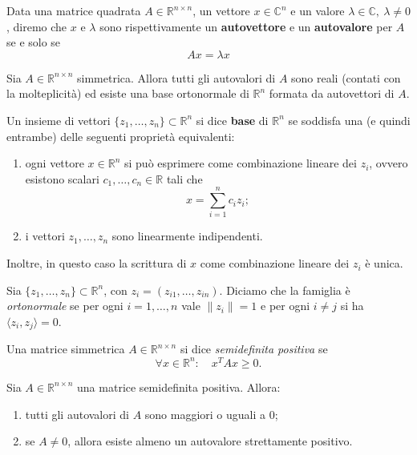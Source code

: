 \begin{definizione}
    Data una matrice quadrata $A \in \mathbb{R}^{n\times n}$, un vettore $x \in \mathbb{C}^n$ e un valore $\lambda \in \mathbb{C},\ \lambda \neq 0$, diremo che $x$ e $\lambda$ sono rispettivamente un \textbf{autovettore} e un \textbf{autovalore} per $A$ se e solo se
    \[
        Ax = \lambda x
    \]
\end{definizione}

\begin{teorema}\label{teo:th_rosso}
    Sia \(A\in\mathbb{R}^{n\times n}\) simmetrica. Allora tutti gli autovalori di \(A\) sono reali (contati con la molteplicità) ed esiste una base ortonormale di \(\mathbb{R}^n\) formata da autovettori di \(A\).
\end{teorema}

\begin{definizione}[Base]
    Un insieme di vettori $\{z_1,\dots,z_n\}\subset\mathbb{R}^n$ si dice \textbf{base} di $\mathbb{R}^n$ se soddisfa una (e quindi entrambe) delle seguenti proprietà equivalenti:
    \begin{enumerate}
        \item ogni vettore $x\in\mathbb{R}^n$ si può esprimere come combinazione lineare dei $z_i$, ovvero esistono scalari $c_1,\dots,c_n\in\mathbb{R}$ tali che
        \[
            x=\sum_{i=1}^n c_i z_i;
        \]
        \item i vettori $z_1,\dots,z_n$ sono linearmente indipendenti.
    \end{enumerate}
    Inoltre, in questo caso la scrittura di $x$ come combinazione lineare dei $z_i$ è unica.
\end{definizione}

\begin{definizione}[Ortonormale]
    Sia $\{z_1,\dots,z_n\} \subset \mathbb{R}^n$, con $z_i=(z_{i1},\dots,z_{in})$.
    Diciamo che la famiglia è \emph{ortonormale} se per ogni \(i=1,\dots,n\) vale \(\|z_i\|=1\) e per ogni \(i\neq j\) si ha \(\langle z_i,z_j\rangle=0\).
\end{definizione}

\begin{definizione}
    Una matrice simmetrica \(A\in\mathbb{R}^{n\times n}\) si dice \emph{semidefinita positiva} se
    \[
        \forall x\in\mathbb{R}^n:\quad x^{T} A x \ge 0.
    \]
\end{definizione}

\begin{teorema}\label{teo:th_blu}
    Sia $A\in\mathbb{R}^{n\times n}$ una matrice semidefinita positiva. Allora:
    \begin{enumerate}
        \item tutti gli autovalori di $A$ sono maggiori o uguali a $0$;
        \item se $A\neq 0$, allora esiste almeno un autovalore strettamente positivo.
    \end{enumerate}
\end{teorema}

